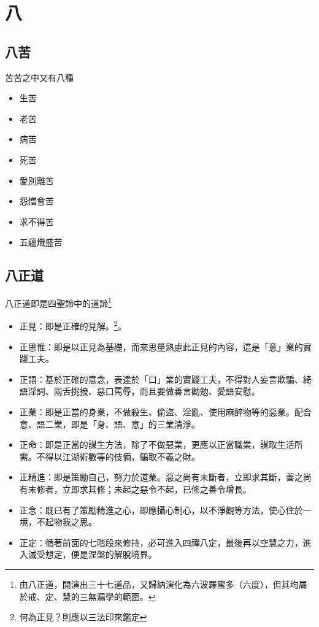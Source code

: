 \section{八}

\subsection{八苦}
苦苦之中又有八種
\begin{itemize}
  \item 生苦
  \item 老苦
  \item 病苦
  \item 死苦
  \item 愛別離苦
  \item 怨憎會苦
  \item 求不得苦
  \item 五蘊熾盛苦
\end{itemize}

\subsection{八正道}
八正道即是四聖諦中的道諦\footnote{由八正道，開演出三十七道品，又歸納演化為六波羅蜜多（六度），但其均屬於戒、定、慧的三無漏學的範圍。}
\begin{itemize}
  \item 正見：即是正確的見解。\footnote{何為正見？則應以三法印來鑑定}。
  \item 正思惟：即是以正見為基礎，而來思量熟慮此正見的內容，這是「意」業的實踐工夫。
  \item 正語：基於正確的意念，表達於「口」業的實踐工夫，不得對人妄言欺騙、綺語淫詞、兩舌挑撥、惡口罵辱，而且要做善言勸勉、愛語安慰。
  \item 正業：即是正當的身業，不做殺生、偷盜、淫亂、使用麻醉物等的惡業。配合意、語二業，即是「身、語、意」的三業清淨。
  \item 正命：即是正當的謀生方法，除了不做惡業，更應以正當職業，謀取生活所需。不得以江湖術數等的伎倆，騙取不義之財。
  \item 正精進：即是策勵自己，努力於道業。惡之尚有未斷者，立即求其斷，善之尚有未修者，立即求其修；未起之惡令不起，已修之善令增長。
  \item 正念：既已有了策勵精進之心，即應攝心制心，以不淨觀等方法，使心住於一境，不起物我之思。
  \item 正定：循著前面的七階段來修持，必可進入四禪八定，最後再以空慧之力，進入滅受想定，便是涅槃的解脫境界。
\end{itemize}
